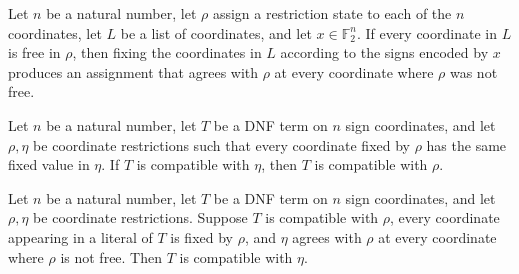 \begin{theorem}
\label{FABL.CoordRestriction.extends_fixCoordinateList}
\leanok
{}
Let $n$ be a natural number, let $\rho$ assign a restriction state to each of the $n$
coordinates, let $L$ be a list of coordinates, and let $x\in\mathbb{F}_2^n$. If every
coordinate in $L$ is free in $\rho$, then fixing the coordinates in $L$ according to the
signs encoded by $x$ produces an assignment that agrees with $\rho$ at every coordinate
where $\rho$ was not free.
\end{theorem}

\begin{theorem}
\label{FABL.DNFTerm.compatible_of_extends}
\leanok
{}
Let $n$ be a natural number, let $T$ be a DNF term on $n$ sign coordinates, and let
$\rho,\eta$ be coordinate restrictions such that every coordinate fixed by $\rho$ has
the same fixed value in $\eta$. If $T$ is compatible with $\eta$, then $T$ is compatible
with $\rho$.
\end{theorem}

\begin{theorem}
\label{FABL.DNFTerm.compatible_of_extends_of_no_free}
\leanok
{}
Let $n$ be a natural number, let $T$ be a DNF term on $n$ sign coordinates, and let
$\rho,\eta$ be coordinate restrictions. Suppose $T$ is compatible with $\rho$, every
coordinate appearing in a literal of $T$ is fixed by $\rho$, and $\eta$ agrees with
$\rho$ at every coordinate where $\rho$ is not free. Then $T$ is compatible with $\eta$.
\end{theorem}

